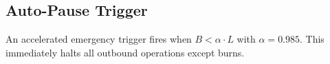 \subsection{Auto-Pause Trigger}

An accelerated emergency trigger fires when $B < \alpha \cdot L$ with $\alpha = 0.985$. This immediately halts all outbound operations except burns.


